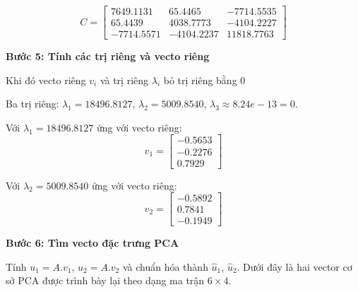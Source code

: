 \[
C = \begin{bmatrix}
7649.1131 & 65.4465 & -7714.5535 \\
65.4439 & 4038.7773 & -4104.2227 \\
-7714.5571 & -4104.2237 & 11818.7763
\end{bmatrix}
\]

\textbf{Bước 5: Tính các trị riêng và vecto riêng}

Khi đó vecto riêng $v_i$ và trị riêng $\lambda_i$ bỏ trị riêng bằng 0

Ba trị riêng: $\lambda_1 = 18496.8127$, $\lambda_2 = 5009.8540$, $\lambda_3 \approx 8.24e - 13 = 0$.

Với $\lambda_1 = 18496.8127$ ứng với vecto riêng:
\[
v_1 = \begin{bmatrix}
-0.5653 \\
-0.2276 \\
0.7929
\end{bmatrix}
\]

Với $\lambda_2 = 5009.8540$ ứng với vecto riêng:
\[
v_2 = \begin{bmatrix}
-0.5892 \\
0.7841 \\
-0.1949
\end{bmatrix}
\]

\textbf{Bước 6: Tìm vecto đặc trưng PCA}

Tính $u_1 = A.v_1$, $u_2 = A.v_2$ và chuẩn hóa thành $\hat{u}_1$, $\hat{u}_2$. Dưới đây là hai vector cơ sở PCA được trình bày lại theo dạng ma trận $6 \times 4$.

